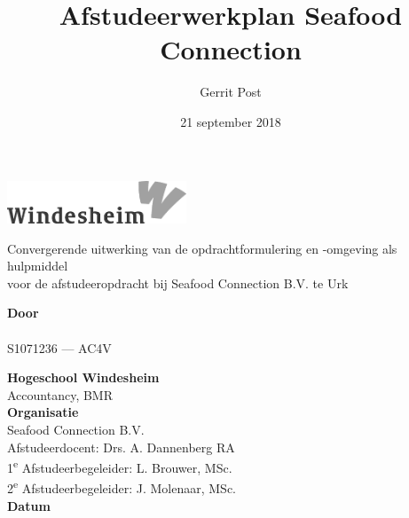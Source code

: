 \documentclass[10pt,a4paper,oneside]{report}
\title{Afstudeerwerkplan Seafood Connection}
\author{Gerrit Post}
\date{21 september 2018}
\begin{document}
\begin{titlepage}
    \begin{adjustwidth*}{-2cm}{-2cm}
    \vspace*{-3.5cm}
    \hspace{12cm}
    \vspace{2cm}
    \includegraphics[width=0.4\textwidth]{download} \\
    \begin{center}
    \vspace*{1cm}
    {\Huge\thetitle}
    
    \vspace*{0.4cm}
    \textnormal{Convergerende uitwerking van de opdrachtformulering en -omgeving als hulpmiddel \\
    voor de afstudeeropdracht bij Seafood Connection B.V. te Urk}
    
    \vspace{5cm}
    \textbf{Door} \\
    \theauthor \\
    S1071236 --- AC4V
    
    \vspace{0.7cm}
    \textbf{Hogeschool Windesheim} \\
    Accountancy, BMR \\
    
    \vspace{0.7cm}
    \textbf{Organisatie} \\
    Seafood Connection B.V. \\

    \vspace{0.7cm}
    Afstudeerdocent: Drs. A. Dannenberg RA \\
    1\textsuperscript{e} Afstudeerbegeleider: L. Brouwer, MSc. \\
    2\textsuperscript{e} Afstudeerbegeleider: J. Molenaar, MSc. \\

    \vspace{0.7cm}
    \textbf{Datum} \\
    \thedate
    \end{center}
    \end{adjustwidth*}
\end{titlepage}
\end{document}
